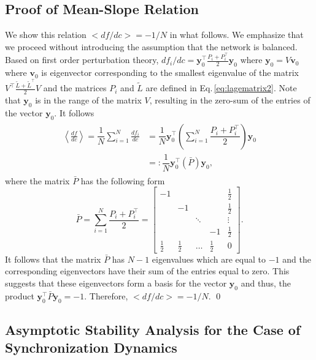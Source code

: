 \documentclass[%
 reprint,
 amsmath,amssymb,
 aip,
]{revtex4-2}
\def \by {\pmb{y}}
\def \bv {\pmb{v}}
\theoremstyle{italichead}
\theoremstyle{definition}
\begin{document}
{\subsection{Proof of Mean-Slope Relation} \label{sec:meanslope}

We show this relation $< df / d c > = -1/N$ in what follows.
{
We emphasize that we proceed without introducing the assumption that the network is  balanced.
}
Based on first order perturbation theory, $df_i / dc = \by_0^\top \frac{P_i + P_i^\top}{2} \by_0$ where $\by_0 = V \bv_0$ where $\bv_0$ is eigenvector corresponding to the smallest eigenvalue of the matrix $V^\top \frac{\tilde{L} + \tilde{L}^\top}{2}V$ and the matrices $P_i$ and $\tilde{L}$ are defined in Eq.\,\eqref{eq:lagematrix2}.
Note that $\by_0$ is in the range of the matrix $V$, resulting in the zero-sum of the entries of the vector $\by_0$.
It follows
\begin{align}
\begin{split}
    \left< \frac{d f}{d c} \right> = \dfrac{1}{N} \sum_{i=1}^N \frac{d f_i}{d c} & = \dfrac{1}{N} \by_0^\top \left( \sum_{i=1}^N  \dfrac{P_i + P_i^\top}{2}\right) \by_0 \\
    & =: \dfrac{1}{N} \by_0^\top \left( \bar{P}\right) \by_0,
\end{split}
\end{align}
where the matrix $\bar{P}$ has the following form
\begin{equation}
    \bar{P} = \sum_{i=1}^N  \dfrac{P_i + P_i^\top}{2} = \begin{bmatrix}
-1 &  &  &  & \frac{1}{2} \\ 
 & -1 & &  & \frac{1}{2} \\ 
 &  & \ddots &  & \vdots \\ 
 &  &  & -1 & \frac{1}{2} \\ 
\frac{1}{2} & \frac{1}{2} & \hdots & \frac{1}{2} & 0 
\end{bmatrix}.
\end{equation}
It follows that the matrix $\bar{P}$ has $N-1$ eigenvalues which are equal to $-1$ and the corresponding eigenvectors have their sum of the entries equal to zero. 
This suggests that these eigenvectors form a basis for the vector $\by_0$ and thus, the product $\by_0^\top \bar{P} \by_0 = -1$. 
Therefore, $< df / d c > = -1/N$. 
\hfill \qed




\subsection{Asymptotic Stability Analysis for the Case of Synchronization Dynamics \label{Sec:MAI}}

}
\end{document}
